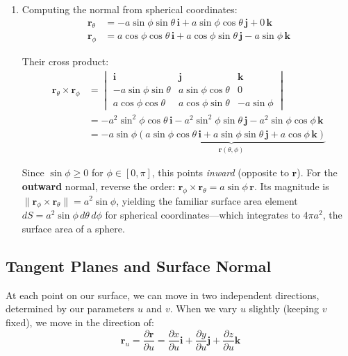 \begin{example}
\begin{solution}
\begin{enumerate}
\item Computing the normal from spherical coordinates:
\begin{align*}
\mathbf{r}_\theta &= -a\sin\phi\sin\theta\,\mathbf{i} + a\sin\phi\cos\theta\,\mathbf{j} + 0\,\mathbf{k} \\
\mathbf{r}_\phi &= a\cos\phi\cos\theta\,\mathbf{i} + a\cos\phi\sin\theta\,\mathbf{j} - a\sin\phi\,\mathbf{k}
\end{align*}

Their cross product:
\begin{align*}
\mathbf{r}_\theta \times \mathbf{r}_\phi &= \begin{vmatrix} \mathbf{i} & \mathbf{j} & \mathbf{k} \\ -a\sin\phi\sin\theta & a\sin\phi\cos\theta & 0 \\ a\cos\phi\cos\theta & a\cos\phi\sin\theta & -a\sin\phi \end{vmatrix} \\
&= -a^2\sin^2\phi\cos\theta\,\mathbf{i} - a^2\sin^2\phi\sin\theta\,\mathbf{j} - a^2\sin\phi\cos\phi\,\mathbf{k} \\
&= -a\sin\phi\underbrace{\left(a\sin\phi\cos\theta\,\mathbf{i} + a\sin\phi\sin\theta\,\mathbf{j} + a\cos\phi\,\mathbf{k}\right)}_{\mathbf{r}(\theta,\phi)}
\end{align*}

Since $\sin\phi \geq 0$ for $\phi \in [0,\pi]$, this points \textit{inward} (opposite to $\mathbf{r}$). For the \textbf{outward} normal, reverse the order: $\mathbf{r}_\phi \times \mathbf{r}_\theta = a\sin\phi\,\mathbf{r}$. Its magnitude is $\|\mathbf{r}_\phi \times \mathbf{r}_\theta\| = a^2\sin\phi$, yielding the familiar surface area element $dS = a^2\sin\phi\,d\theta\,d\phi$ for spherical coordinates---which integrates to $4\pi a^2$, the surface area of a sphere.
\end{enumerate}
\end{solution}
\end{example}
\exampleline


\subsection*{Tangent Planes and Surface Normal}

\noindent At each point on our surface, we can move in two independent directions, determined by our parameters $u$ and $v$. When we vary $u$ slightly (keeping $v$ fixed), we move in the direction of:
\[
\mathbf{r}_u = \frac{\partial \mathbf{r}}{\partial u} = \frac{\partial x}{\partial u}\mathbf{i} + \frac{\partial y}{\partial u}\mathbf{j} + \frac{\partial z}{\partial u}\mathbf{k}
\]

